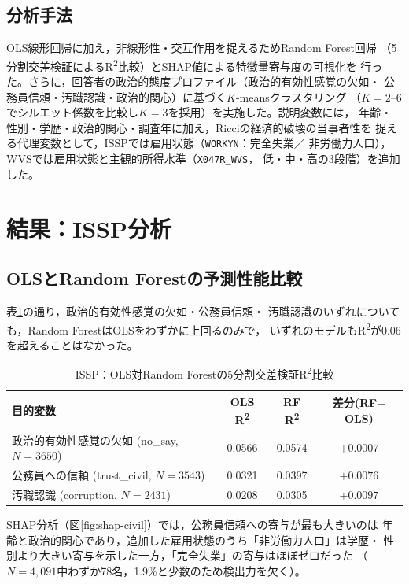 \documentclass[dvipdfmx, a4paper, 11pt]{jsarticle}
\begin{document}
\subsection{分析手法}
OLS線形回帰に加え，非線形性・交互作用を捉えるためRandom Forest回帰
（5分割交差検証によるR\textsuperscript{2}比較）とSHAP値による特徴量寄与度の可視化を
行った。さらに，回答者の政治的態度プロファイル（政治的有効性感覚の欠如・
公務員信頼・汚職認識・政治的関心）に基づく$K$-meansクラスタリング
（$K=2$--$6$でシルエット係数を比較し$K=3$を採用）を実施した。説明変数には，
年齢・性別・学歴・政治的関心・調査年に加え，Ricciの経済的破壊の当事者性を
捉える代理変数として，ISSPでは雇用状態（\texttt{WORKYN}：完全失業／
非労働力人口），WVSでは雇用状態と主観的所得水準（\texttt{X047R\_WVS}，
低・中・高の3段階）を追加した。

\section{結果：ISSP分析}

\subsection{OLSとRandom Forestの予測性能比較}
表\ref{tab:ml-comparison}の通り，政治的有効性感覚の欠如・公務員信頼・
汚職認識のいずれについても，Random ForestはOLSをわずかに上回るのみで，
いずれのモデルもR\textsuperscript{2}が0.06を超えることはなかった。

\begin{table}[H]
\centering
\caption{ISSP：OLS対Random Forestの5分割交差検証R\textsuperscript{2}比較}
\label{tab:ml-comparison}
\begin{tabular}{lccc}
\toprule
目的変数 & OLS R\textsuperscript{2} & RF R\textsuperscript{2} & 差分(RF$-$OLS) \\
\midrule
政治的有効性感覚の欠如 (no\_say, $N=3650$) & 0.0566 & 0.0574 & $+0.0007$ \\
公務員への信頼 (trust\_civil, $N=3543$) & 0.0321 & 0.0397 & $+0.0076$ \\
汚職認識 (corruption, $N=2431$) & 0.0208 & 0.0305 & $+0.0097$ \\
\bottomrule
\end{tabular}
\end{table}

SHAP分析（図\ref{fig:shap-civil}）では，公務員信頼への寄与が最も大きいのは
年齢と政治的関心であり，追加した雇用状態のうち「非労働力人口」は学歴・
性別より大きい寄与を示した一方，「完全失業」の寄与はほぼゼロだった
（$N=4{,}091$中わずか78名，1.9\%と少数のため検出力を欠く）。
\end{document}
